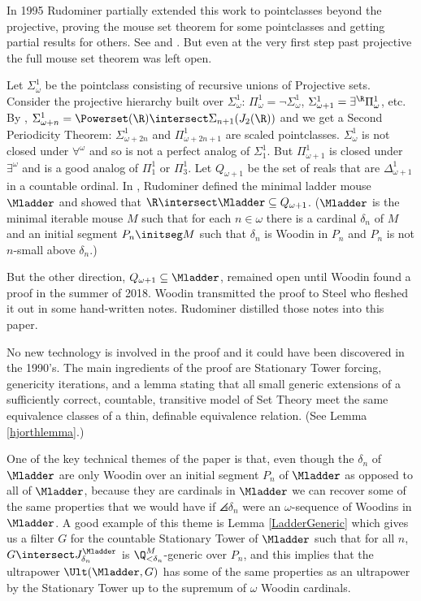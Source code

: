 \documentclass[oneside,12pt]{amsart}
\begin{document}
In 1995 Rudominer partially extended this work to pointclasses beyond the projective,
proving the mouse set theorem for some pointclasses
and getting partial results for others. See \cite{My_Thesis} and \cite{Mouse_Sets}.
But even at the very first step past projective the full mouse set theorem was left open.

Let $\Sigma^1_{\omega}$
be the pointclass consisting of recursive unions of Projective sets. Consider
the projective hierarchy built over $\Sigma^1_{\omega}$:
$\Pi^1_{\omega} = \neg \Sigma^1_{\omega}$,
$\Sigma^1_{\omega+1} = \exists^{\R} \Pi^1_{\omega}$, etc.
By \cite{Scales_In_LofR}, $\Sigma^1_{\omega+n} = \Powerset(\R)\intersect \Sigma_{n+1}(J_2(\R))$
and we get a Second Periodicity Theorem: $\Sigma^1_{\omega+2n}$ and $\Pi^1_{\omega+2n+1}$ are scaled pointclasses.
$\Sigma^1_{\omega}$ is not closed under $\forall^{\omega}$ and so is not a perfect analog of $\Sigma^1_1$.
But $\Pi^1_{\omega+1}$ is closed under $\exists^{\omega}$ and is a good analog of $\Pi^1_1$ or $\Pi^1_3$.
Let $Q_{\omega+1}$ be the set of reals that are $\Delta^1_{\omega+1}$ in a countable ordinal.
In \cite{My_Thesis}, Rudominer defined the minimal ladder mouse $\Mladder$ and showed that
$\R\intersect\Mladder\subseteq Q_{\omega+1}$. ($\Mladder$ is the minimal iterable mouse $M$ such
that for each $n\in\omega$ there is a cardinal $\delta_n$ of $M$ and an initial segment $P_n \initseg M$
such that $\delta_n$ is Woodin in $P_n$ and $P_n$ is not $n$-small above $\delta_n$.)

But the other direction, $Q_{\omega+1} \subseteq \Mladder$, remained open until
Woodin found a proof in the summer of 2018. Woodin transmitted the proof to Steel who fleshed it out
in some hand-written notes. Rudominer distilled those notes into this paper.

No new technology is involved in the proof and it could have been discovered in the 1990's. The main ingredients
of the proof are Stationary Tower forcing, genericity iterations, and a lemma stating that
all small generic extensions of a sufficiently correct, countable, transitive model of Set Theory
meet the same equivalence classes of a thin, definable equivalence
relation. (See Lemma \ref{hjorthlemma}.)

One of the key technical themes of the paper is that, even though
the $\delta_n$ of $\Mladder$ are only Woodin over an initial segment $P_n$
of $\Mladder$ as opposed to all of $\Mladder$, because they are
cardinals in $\Mladder$ we can recover some of the same properties
that we would have if $\angles{\delta_n}$ were an $\omega$-sequence
of Woodins in $\Mladder$. A good example of this theme is Lemma
\ref{LadderGeneric} which gives us a filter $G$ for the countable
Stationary Tower of $\Mladder$ such that for all $n$,
$G\intersect J^{\Mladder}_{\delta_n}$ is $\Q_{<\delta_n}^M$-generic over $P_n$, and this implies
that the ultrapower $\Ult(\Mladder, G)$ has some of the same properties as an
ultrapower by the Stationary Tower up to the supremum
of $\omega$ Woodin cardinals.
\end{document}
